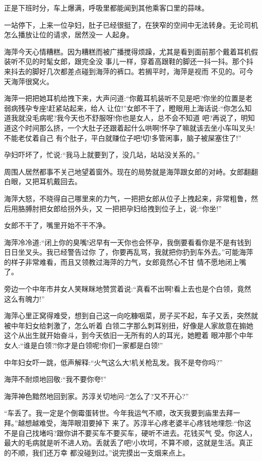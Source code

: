 \documentclass[11pt,a4paper,onecolumn]{article}
\begin{document}
正是下班时分，车上爆满，呼吸里都能闻到其他乘客口里的蒜味。

一站停下，上来一位孕妇，肚子已经很挺了，在狭窄的空间中无法转身。无论司机怎么播放让位的请求，居然没一
人起身。

海萍今天心情糟糕。因为糟糕而被广播搅得烦躁，尤其是看到面前那个戴着耳机假装听不见的时髦女郎，跟完全没
事儿一样，穿着高跟鞋的脚还一抖一抖。那个抖来抖去的脚好几次都差点碰到海萍的裤口。若搁平时，海萍是视而
不见的。可今天海萍很窝火。

海萍一把把她耳机给拽下来，大声问道:``你戴耳机装听不见是吧?你坐的位置是老弱病残孕专座!赶紧站起来，给人
让位!''女郎不干了，瞪眼用上海话说:``你怎么知道我就没毛病呢?我今天也不舒服呀!你也是女人，总不会不知道
吧?再说了，明知道这个时间那么挤，一个大肚子还跟着起什么哄啊!怀孕了嘛就该去坐小车叫叉头!不能老仗着自己
有个肚子，平白就赚位子吧!切!多管闲事，脑子被屎塞住了!''

孕妇吓坏了，忙说:``我马上就要到了，没几站，站站没关系的。''

周围人居然都事不关己地望着窗外。现在的局势就是海萍跟女郎的对峙。女郎翻翻白眼，又把耳机戴回去。

海萍大怒，不晓得自己哪里来的力气，一把把女郎从位子上拽起来，非常粗鲁，然后用胳膊肘把女郎给拐外头，又
一把把孕妇给拽到位子上，说:``你坐!''

女郎不干了，嘴里开始不干不净。

海萍冷冷道:``闭上你的臭嘴!迟早有一天你也会怀孕，我倒要看看你是不是有钱到日日坐叉头。我已经警告过你
了，你要再乱骂，我就把你扔到车外去。''可能海萍的样子非常难看，而且又领教过海萍的力气，女郎竟然心不甘
情不愿地闭上嘴了。

旁边一个中年市井女人笑眯眯地赞赏着说:``真看不出啊!看上去也是个白领，竟然这么有魄力!''

海萍心里正窝得难受，想到自己这一向吃糠咽菜，房子买不起，车子又丢，突然就被中年妇女给刺激了，怎么听着
白领二字那么刺耳别扭，好像是人家故意在搧她这个从出生就开始奋斗，到今天依旧一无所有的人的耳光，她瞪着
眼冲那个中年女人:``谁是白领?!你才是白领呢!你们一家都是白领!''

中年妇女吓一跳，低声解释:``火气这么大!机关枪乱发。我不是夸你吗?''

海萍不耐烦地回敬:``我不要你夸!''

海萍神色黯然地回到家。苏淳关切地问:``怎么了?又不开心?''

``车丢了。我一定是个倒霉蛋转世。今年我运气不顺，改天我要到庙里去拜一拜。''越想越难受，海萍眼泪要掉下
来了。苏淳半心疼老婆半心疼钱地埋怨:``你这不是自己找堵吗?跟你讲不要买车不要买车，硬听不进去。花钱买气
受。你这人，最大的毛病就是听不进人劝。丢就丢了吧!小坎坷，不算不顺，这就是生活。真正的不顺，我们还万幸
都没碰到过。''说完摸出一支烟来点上。
\end{document}
